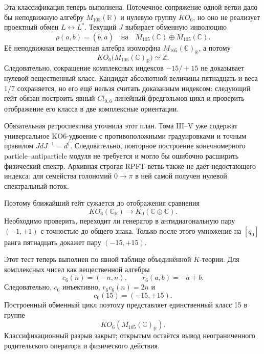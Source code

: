 Эта классификация теперь выполнена. Поточечное сопряжение одной ветви
дало бы неподвижную алгебру $M_{105}(\mathbb R)$ и нулевую группу
$KO_6$, но оно не реализует проектный обмен $L\leftrightarrow L^*$.
Текущий $J$ выбирает обменную инволюцию
\begin{equation}
 \rho(a,b)=(\overline b,\overline a)
 \quad\text{на}\quad
 M_{105}(\mathbb C)\oplus M_{105}(\mathbb C).
\end{equation}
Её неподвижная вещественная алгебра изоморфна
$M_{105}(\mathbb C)_{\mathbb R}$, а потому
\begin{equation}
 KO_6\bigl(M_{105}(\mathbb C)_{\mathbb R}\bigr)\simeq\mathbb Z.
\end{equation}
Следовательно, сокращение комплексных индексов $-15/+15$ не доказывает
нулевой вещественный класс. Кандидат абсолютной величины пятнадцать и
веса $1/7$ сохраняется, но его ещё нельзя считать доказанным индексом:
следующий гейт обязан построить явный $Cl_{0,6}$-линейный фредгольмов
цикл и проверить отображение его класса в две комплексные ориентации.

Обязательная ретроспектива уточнила этот план. Тома III--V уже содержат
универсальное KO6-удвоение с противоположными градуировками и точным
правилом $JdJ^{-1}=d^\dagger$. Следовательно, повторное построение
конечномерного particle--antiparticle модуля не требуется и могло бы
ошибочно расширить физический спектр. Архивная строгая RPFT-ветвь также
не даёт недостающего индекса: для семейства голономий $0\to\pi$ в ней
самой получен нулевой спектральный поток.

Поэтому ближайший гейт сужается до отображения сравнения
\begin{equation}
 KO_6(\mathbb C_{\mathbb R})\longrightarrow
 K_0(\mathbb C\oplus\mathbb C).
\end{equation}
Необходимо проверить, переходит ли генератор в антидиагональную пару
$(-1,+1)$ с точностью до общего знака. Только после этого умножение на
$[q_0]$ ранга пятнадцать докажет пару $(-15,+15)$.

Этот тест теперь выполнен по явной таблице объединённой $K$-теории.
Для комплексных чисел как вещественной алгебры
\begin{equation}
 c_6(n)=(-n,n),
 \qquad
 r_6(a,b)=-a+b.
\end{equation}
Следовательно, $c_6$ инъективно,
$r_6c_6(n)=2n$ и
\begin{equation}
 c_6(15)=(-15,+15).
\end{equation}
Построенный обменный цикл поэтому представляет единственный класс 15 в
группе
\[
 KO_6(M_{105}(\mathbb C)_{\mathbb R}).
\]
Классификационный разрыв закрыт; открытым остаётся вывод неограниченного
родительского оператора и физического действия.


